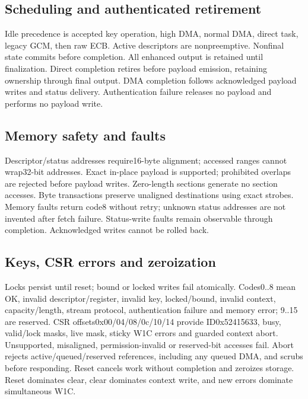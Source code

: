 \documentclass[11pt,a4paper]{article}
\begin{document}
\subsection{Scheduling and authenticated retirement}

Idle precedence is accepted key operation,\allowbreak{} high DMA,\allowbreak{} normal DMA,\allowbreak{} direct task,\allowbreak{} legacy GCM,\allowbreak{} then raw ECB. Active descriptors are nonpreemptive. Nonfinal state commits before completion. All enhanced output is retained until finalization. Direct completion retires before payload emission,\allowbreak{} retaining ownership through final output. DMA completion follows acknowledged payload writes and status delivery. Authentication failure releases no payload and performs no payload write.

\subsection{Memory safety and faults}

Descriptor/\allowbreak{}status addresses require16-byte alignment; accessed ranges cannot wrap32-bit addresses. Exact in-place payload is supported; prohibited overlaps are rejected before payload writes. Zero-length sections generate no section accesses. Byte transactions preserve unaligned destinations using exact strobes. Memory faults return code8 without retry; unknown status addresses are not invented after fetch failure. Status-write faults remain observable through completion. Acknowledged writes cannot be rolled back.

\subsection{Keys,\allowbreak{} CSR errors and zeroization}

Locks persist until reset; bound or locked writes fail atomically. Codes0..8 mean OK,\allowbreak{} invalid descriptor/\allowbreak{}register,\allowbreak{} invalid key,\allowbreak{} locked/\allowbreak{}bound,\allowbreak{} invalid context,\allowbreak{} capacity/\allowbreak{}length,\allowbreak{} stream protocol,\allowbreak{} authentication failure and memory error; 9..15 are reserved. CSR offsets0x00/\allowbreak{}04/\allowbreak{}08/\allowbreak{}0c/\allowbreak{}10/\allowbreak{}14 provide ID0x52415633,\allowbreak{} busy,\allowbreak{} valid/\allowbreak{}lock masks,\allowbreak{} live mask,\allowbreak{} sticky W1C errors and guarded context abort. Unsupported,\allowbreak{} misaligned,\allowbreak{} permission-invalid or reserved-bit accesses fail. Abort rejects active/\allowbreak{}queued/\allowbreak{}reserved references,\allowbreak{} including any queued DMA,\allowbreak{} and scrubs before responding. Reset cancels work without completion and zeroizes storage. Reset dominates clear,\allowbreak{} clear dominates context write,\allowbreak{} and new errors dominate simultaneous W1C.
\end{document}
